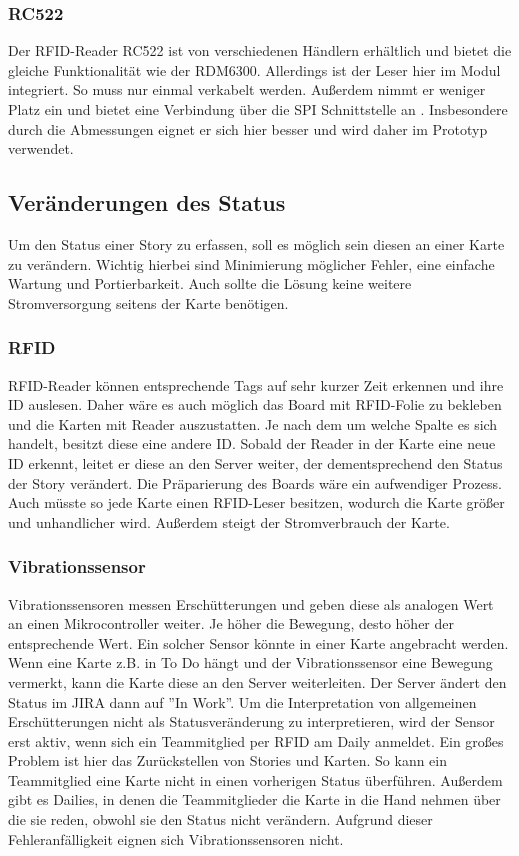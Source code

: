 \documentclass[12pt,titlepage]{scrartcl}
\begin{document}
			\subsubsection{RC522}
			Der RFID-Reader RC522 ist von verschiedenen Händlern erhältlich und bietet die gleiche Funktionalität wie der RDM6300. Allerdings ist der Leser hier im Modul integriert. So muss nur einmal verkabelt werden. Außerdem nimmt er weniger Platz ein und bietet eine Verbindung über die SPI Schnittstelle an \cite{rfidspecs}. Insbesondere durch die Abmessungen eignet er sich hier besser und wird daher im Prototyp verwendet.
		\subsection{Veränderungen des Status} \label{changeStatus}
		Um den Status einer Story zu erfassen, soll es möglich sein diesen an einer Karte zu verändern. Wichtig hierbei sind Minimierung möglicher Fehler, eine einfache Wartung und Portierbarkeit. Auch sollte die Lösung keine weitere Stromversorgung seitens der Karte benötigen.
			\subsubsection{RFID}
			RFID-Reader können entsprechende Tags auf sehr kurzer Zeit erkennen und ihre ID auslesen. Daher wäre es auch möglich das Board mit RFID-Folie zu bekleben und die Karten mit Reader auszustatten. Je nach dem um welche Spalte es sich handelt, besitzt diese eine andere ID. Sobald der Reader in der Karte eine neue ID erkennt, leitet er diese an den Server weiter, der dementsprechend den Status der Story verändert. Die Präparierung des Boards wäre ein aufwendiger Prozess. Auch müsste so jede Karte einen RFID-Leser besitzen, wodurch die Karte größer und unhandlicher wird. Außerdem steigt der Stromverbrauch der Karte.
			\subsubsection{Vibrationssensor}
			Vibrationssensoren messen Erschütterungen und geben diese als analogen Wert an einen Mikrocontroller weiter. Je höher die Bewegung, desto höher der entsprechende Wert. Ein solcher Sensor könnte in einer Karte angebracht werden. Wenn eine Karte z.B. in To Do hängt und der Vibrationssensor eine Bewegung vermerkt, kann die Karte diese an den Server weiterleiten. Der Server ändert den Status im JIRA dann auf ''In Work''. Um die Interpretation von allgemeinen Erschütterungen nicht als Statusveränderung zu interpretieren, wird der Sensor erst aktiv, wenn sich ein Teammitglied per RFID am Daily anmeldet. Ein großes Problem ist hier das Zurückstellen von Stories und Karten. So kann ein Teammitglied eine Karte nicht in einen vorherigen Status überführen. Außerdem gibt es Dailies, in denen die Teammitglieder die Karte in die Hand nehmen über die sie reden, obwohl sie den Status nicht verändern. Aufgrund dieser Fehleranfälligkeit eignen sich Vibrationssensoren nicht.
\end{document}
